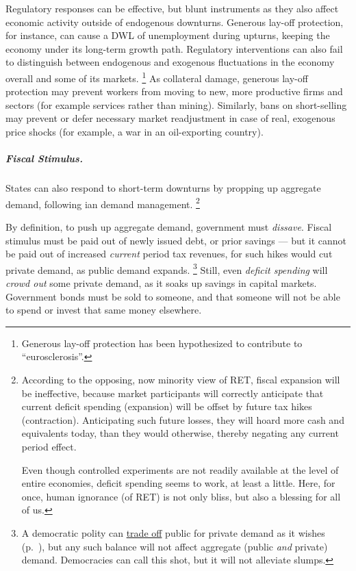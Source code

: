 Regulatory responses can be effective, but blunt instruments as they also affect economic activity outside of endogenous downturns.
Generous lay-off protection, for instance, can cause a \gls{DWL} of unemployment during upturns, keeping the economy under its long-term growth path.
Regulatory interventions can also fail to distinguish between endogenous and exogenous fluctuations in the economy overall and some of its markets.
\footnote{
	Generous lay-off protection has been hypothesized to contribute to ``eurosclerosis''.
}
As collateral damage, generous lay-off protection may prevent workers from moving to new, more productive firms and sectors (for example services rather than mining).
Similarly, bans on short-selling may prevent or defer necessary market readjustment in case of real, exogenous price shocks (for example, a war in an oil-exporting country).

\subparagraph{Fiscal Stimulus.}  \label{sec:fiscal-stimulus}
States can also respond to short-term downturns by propping up aggregate demand, following \citeauthor{Keynes1936}ian demand management.
\footnote{
	According to the opposing, now minority view of \gls{RET}, fiscal expansion will be ineffective, because market participants will correctly anticipate that current deficit spending (expansion) will be offset by future tax hikes (contraction).
	Anticipating such future losses, they will hoard more cash and equivalents today, than they would otherwise, thereby negating any current period effect.

	Even though controlled experiments are not readily available at the level of entire economies, deficit spending seems to work, at least a little.
	Here, for once, human ignorance (of \gls{RET}) is not only bliss, but also a blessing for all of us.
}

By definition, to push up aggregate demand, government must \emph{dissave}.
Fiscal stimulus must be paid out of newly issued debt, or prior savings --- but it cannot be paid out of increased \emph{current} period tax revenues, for such hikes would cut private demand, as public demand expands.
\footnote{
	A democratic polity can \hyperref[sec:trade-offs]{trade off} public for private demand as it wishes (p.~\pageref{sec:trade-offs}), but any such balance will not affect aggregate (public \emph{and} private) demand.
	Democracies can call this shot, but it will not alleviate slumps.
}
Still, even \emph{deficit spending} will \emph{crowd out} some private demand, as it soaks up savings in capital markets.
Government bonds must be sold to someone, and that someone will not be able to spend or invest that same money elsewhere.

